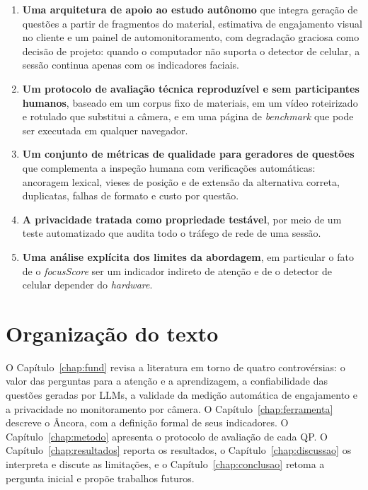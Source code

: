 \documentclass[portuguese,oneside]{tcc}
\newcommand{\ferramenta}{Âncora\xspace}
\newcommand{\estr}[1]{\emph{#1}}
\newcommand{\fs}{\emph{focusScore}\xspace}
\begin{document}
\begin{enumerate}
  \item \textbf{Uma arquitetura de apoio ao estudo autônomo} que integra geração de questões a partir de fragmentos do material, estimativa de engajamento visual no cliente e um painel de automonitoramento, com degradação graciosa como decisão de projeto: quando o computador não suporta o detector de celular, a sessão continua apenas com os indicadores faciais.
  \item \textbf{Um protocolo de avaliação técnica reproduzível e sem participantes humanos}, baseado em um corpus fixo de materiais, em um vídeo roteirizado e rotulado que substitui a câmera, e em uma página de \estr{benchmark} que pode ser executada em qualquer navegador.
  \item \textbf{Um conjunto de métricas de qualidade para geradores de questões} que complementa a inspeção humana com verificações automáticas: ancoragem lexical, vieses de posição e de extensão da alternativa correta, duplicatas, falhas de formato e custo por questão.
  \item \textbf{A privacidade tratada como propriedade testável}, por meio de um teste automatizado que audita todo o tráfego de rede de uma sessão.
  \item \textbf{Uma análise explícita dos limites da abordagem}, em particular o fato de o \fs ser um indicador indireto de atenção e de o detector de celular depender do \estr{hardware}.
\end{enumerate}

\section{Organização do texto}

O Capítulo~\ref{chap:fund} revisa a literatura em torno de quatro controvérsias: o valor das perguntas para a atenção e a aprendizagem, a confiabilidade das questões geradas por LLMs, a validade da medição automática de engajamento e a privacidade no monitoramento por câmera. O Capítulo~\ref{chap:ferramenta} descreve o \ferramenta, com a definição formal de seus indicadores. O Capítulo~\ref{chap:metodo} apresenta o protocolo de avaliação de cada QP. O Capítulo~\ref{chap:resultados} reporta os resultados, o Capítulo~\ref{chap:discussao} os interpreta e discute as limitações, e o Capítulo~\ref{chap:conclusao} retoma a pergunta inicial e propõe trabalhos futuros.

\end{document}
